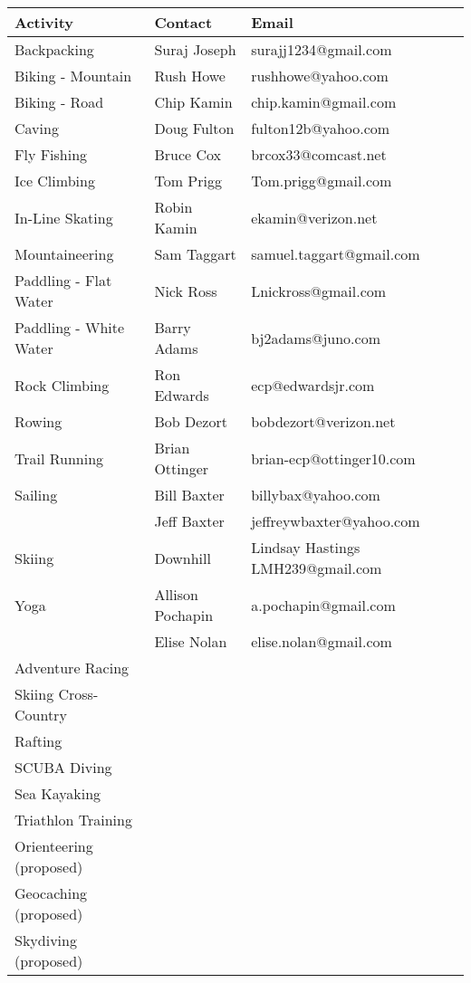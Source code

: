 \documentclass[10pt,a4paper]{article}
\begin{document}
\begin{center}
    \begin{tabular}{ | l | l | l | }
    \hline
    \textbf{Activity} & \textbf{Contact} & \textbf{Email} \\\hline
	Backpacking & Suraj Joseph & surajj1234@gmail.com \\ \hline
	Biking - Mountain & Rush Howe & rushhowe@yahoo.com \\ \hline
	Biking - Road & Chip Kamin & chip.kamin@gmail.com \\ \hline
    Caving  & Doug Fulton & fulton12b@yahoo.com\\ \hline
    Fly Fishing & Bruce Cox & brcox33@comcast.net\\ \hline
    Ice Climbing & Tom Prigg & Tom.prigg@gmail.com\\ \hline
    In-Line Skating & Robin Kamin & ekamin@verizon.net\\ \hline
    Mountaineering & Sam Taggart & samuel.taggart@gmail.com\\ \hline
    Paddling - Flat Water & Nick Ross & Lnickross@gmail.com\\ \hline
    Paddling - White Water & Barry Adams & bj2adams@juno.com\\ \hline
    Rock Climbing & Ron Edwards & ecp@edwardsjr.com\\ \hline
    Rowing & Bob Dezort & bobdezort@verizon.net\\ \hline
    Trail Running & Brian Ottinger &  brian-ecp@ottinger10.com\\ \hline
    Sailing & Bill Baxter & billybax@yahoo.com\\ \hline
		   &  Jeff Baxter& jeffreywbaxter@yahoo.com\\ \hline
	Skiing & Downhill  &  Lindsay Hastings LMH239@gmail.com\\ \hline
	Yoga  &  Allison Pochapin & a.pochapin@gmail.com\\ \hline
            &  Elise Nolan & elise.nolan@gmail.com\\ \hline
	Adventure Racing & & \\ \hline
	Skiing  Cross-Country & & \\ \hline
	Rafting & & \\ \hline
	SCUBA Diving & & \\ \hline
	Sea Kayaking & & \\ \hline
	Triathlon Training & & \\ \hline
	Orienteering (proposed) & & \\ \hline
	Geocaching (proposed) & & \\ \hline
	Skydiving (proposed) & & \\ \hline
	 \hline
    \end{tabular}
\end{center}
\end{document}
